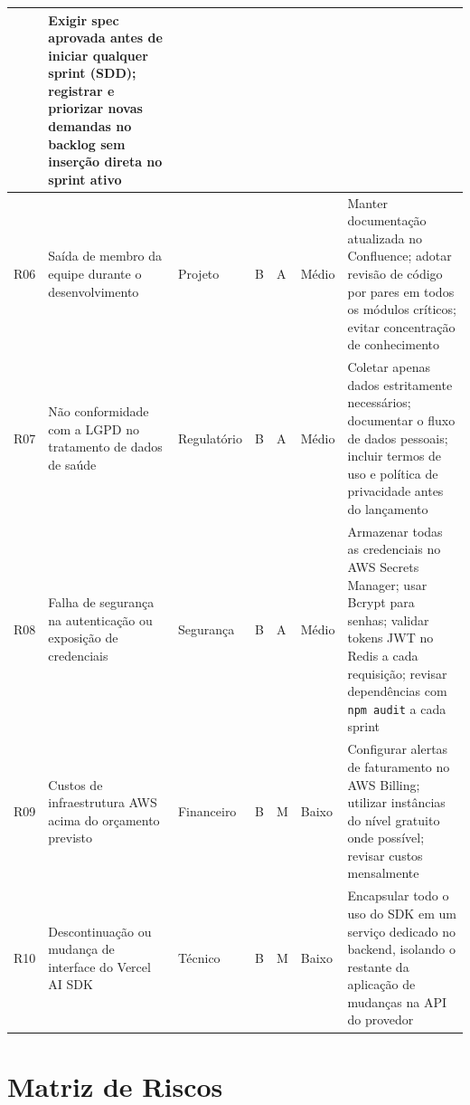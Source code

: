\begin{table}[H]
{\begin{tabular}{p{0.6cm}p{3.2cm}p{1.8cm}p{1cm}p{1cm}p{1.2cm}p{5cm}}
      & Exigir spec aprovada antes de iniciar
        qualquer sprint (SDD); registrar e priorizar
        novas demandas no backlog sem inserção
        direta no sprint ativo \\
    \midrule
    R06
      & Saída de membro da equipe durante o
        desenvolvimento
      & Projeto
      & B & A
      & \cellcolor{warning!30} Médio
      & Manter documentação atualizada no
        Confluence; adotar revisão de código por
        pares em todos os módulos críticos;
        evitar concentração de conhecimento \\
    \midrule
    R07
      & Não conformidade com a LGPD no
        tratamento de dados de saúde
      & Regulatório
      & B & A
      & \cellcolor{warning!30} Médio
      & Coletar apenas dados estritamente
        necessários; documentar o fluxo de dados
        pessoais; incluir termos de uso e política
        de privacidade antes do lançamento \\
    \midrule
    R08
      & Falha de segurança na autenticação
        ou exposição de credenciais
      & Segurança
      & B & A
      & \cellcolor{warning!30} Médio
      & Armazenar todas as credenciais no AWS
        Secrets Manager; usar Bcrypt para senhas;
        validar tokens JWT no Redis a cada
        requisição; revisar dependências com
        \texttt{npm audit} a cada sprint \\
    \midrule
    R09
      & Custos de infraestrutura AWS acima
        do orçamento previsto
      & Financeiro
      & B & M
      & \cellcolor{success!25} Baixo
      & Configurar alertas de faturamento no
        AWS Billing; utilizar instâncias do
        nível gratuito onde possível;
        revisar custos mensalmente \\
    \midrule
    R10
      & Descontinuação ou mudança de interface
        do Vercel AI SDK
      & Técnico
      & B & M
      & \cellcolor{success!25} Baixo
      & Encapsular todo o uso do SDK em um
        serviço dedicado no backend, isolando
        o restante da aplicação de mudanças
        na API do provedor \\
    \bottomrule
  \end{tabular}}
\end{table}

\section{Matriz de Riscos}
\label{sec:risk-matrix}

